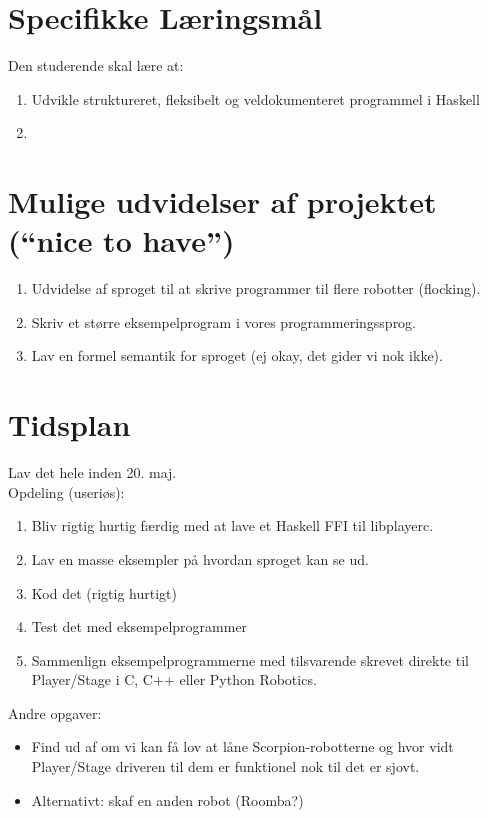 \documentclass[a4paper,oneside, draft]{memoir}
\begin{document}
\section{Specifikke Læringsmål}

Den studerende skal lære at:

\begin{enumerate}
\item Udvikle struktureret, fleksibelt og veldokumenteret programmel i Haskell
\item 
\end{enumerate}


\section{Mulige udvidelser af projektet ("`nice to have"')}
\begin{enumerate}
\item Udvidelse af sproget til at skrive programmer til flere robotter (flocking).
\item Skriv et større eksempelprogram i vores programmeringssprog.
\item Lav en formel semantik for sproget (ej okay, det gider vi nok ikke).
\end{enumerate}

\section{Tidsplan}
Lav det hele inden 20. maj.\\

\noindent
Opdeling (useriøs):
\begin{enumerate}
\item Bliv rigtig hurtig færdig med at lave et Haskell FFI til libplayerc.
\item Lav en masse eksempler på hvordan sproget kan se ud.
\item Kod det (rigtig hurtigt)
\item Test det med eksempelprogrammer
\item Sammenlign eksempelprogrammerne med tilsvarende skrevet direkte
  til Player/Stage i C, C++ eller Python Robotics.
\end{enumerate}

\noindent
Andre opgaver:
\begin{itemize}
\item Find ud af om vi kan få lov at låne Scorpion-robotterne og hvor
  vidt Player/Stage driveren til dem er funktionel nok til det er sjovt.
\item Alternativt: skaf en anden robot (Roomba?)
\end{itemize}
\end{document}
